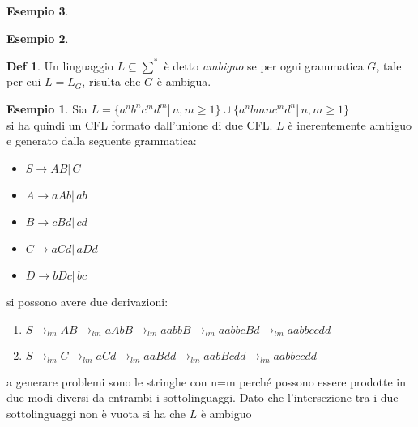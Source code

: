\documentclass[a4paper]{book}
\theoremstyle{definition}%
\newtheorem*{defi}{Def}%
\newtheorem*{esempio}{Esempio}
\begin{document}
\begin{esempio}
\begin{esempio}
 \begin{defi}
    Un linguaggio $L \subseteq \sum^*$ è detto \emph{ambiguo} se per ogni grammatica $G$, tale per cui $L = L_G$, risulta che $G$ è ambigua.
  \end{defi}
\begin{esempio}
Sia $L=\{a^nb^nc^md^m|\, n,m\geq 1\}\cup \{a^nbmnc^md^n|\, n,m\geq 1\}$\\
si ha quindi un CFL formato dall'unione di due CFL. $L$ è inerentemente ambiguo e generato dalla seguente grammatica:
\begin{itemize}
\item $S\to AB|\,C$
\item $A\to aAb|\,ab$
\item $B\to cBd|\, cd$
\item $C\to aCd|\, aDd$
\item $D\to bDc|\, bc$
\end{itemize}
si possono avere due derivazioni:
\begin{enumerate}
\item $S\to_{lm}AB\to_{lm} aAbB\to_{lm} aabbB\to_{lm}aabbcBd\to_{lm}aabbccdd$
\item $S\to_{lm} C\to_{lm} aCd\to_{lm}aaBdd\to_{lm}aabBcdd\to_{lm}aabbccdd$
\end{enumerate}
a generare problemi sono le stringhe con n=m perché possono essere prodotte in due modi diversi da entrambi i sottolinguaggi. Dato che l'intersezione tra i due sottolinguaggi non è vuota si ha che $L$ è ambiguo
\end{esempio}


\end{esempio}
\end{esempio}
\end{document}
